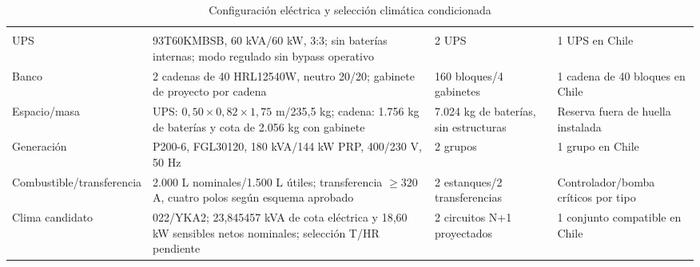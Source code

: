 \begin{paginaHorizontalSynaptix}
\begingroup
\renewcommand{\EstiloTablaSynaptix}{\fontsize{9.5}{12}\selectfont\setstretch{1}\renewcommand{\arraystretch}{1.3}\setlength{\extrarowheight}{2pt}\arrayrulecolor{SynLine}}
\begin{longtable}{L{\dimexpr.25\tabcolsep\relax}L{\dimexpr.35\tabcolsep\relax}L{\dimexpr.18\tabcolsep\relax}L{\dimexpr.22\tabcolsep\relax}}
\caption{Configuración eléctrica y selección climática condicionada}\label{tab:t11-alternativas-ups}\\
\hline
{} &  &  &  \\ \hline
\endfirsthead
\hline
{} &  &  &  \\ \hline
\endhead
UPS & 93T60KMBSB, 60 kVA/60 kW, 3:3; sin baterías internas; modo regulado sin bypass operativo & 2 UPS & 1 UPS en Chile \\ \hline
Banco & 2 cadenas de 40 HRL12540W, neutro 20/20; gabinete de proyecto por cadena & 160 bloques/4 gabinetes & 1 cadena de 40 bloques en Chile \\ \hline
Espacio/masa & UPS: $0,50\times0,82\times1,75$ m/235,5 kg; cadena: 1.756 kg de baterías y cota de 2.056 kg con gabinete & 7.024 kg de baterías, sin estructuras & Reserva fuera de huella instalada \\ \hline
Generación & P200-6, FGL30120, 180 kVA/144 kW PRP, 400/230 V, 50 Hz & 2 grupos & 1 grupo en Chile \\ \hline
Combustible/transferencia & 2.000 L nominales/1.500 L útiles; transferencia $\geq320$ A, cuatro polos según esquema aprobado & 2 estanques/2 transferencias & Controlador/bomba críticos por tipo \\ \hline
Clima candidato & 022/YKA2; 23,845457 kVA de cota eléctrica y 18,60 kW sensibles netos nominales; selección T/HR pendiente & 2 circuitos N+1 proyectados & 1 conjunto compatible en Chile \\ \hline
\end{longtable}
\endgroup
\end{paginaHorizontalSynaptix}


